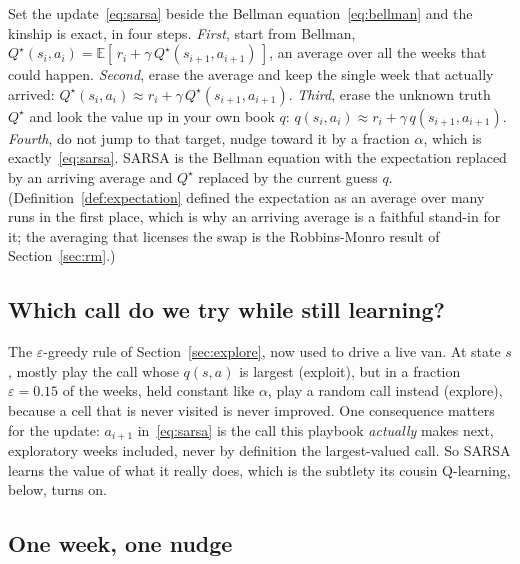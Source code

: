 \documentclass[11pt,a4paper]{article}
\theoremstyle{definition}
\theoremstyle{remark}
\numberwithin{equation}{section}
\newcommand{\E}{\mathbb{E}}
\begin{document}
Set the update~\eqref{eq:sarsa} beside the Bellman equation~\eqref{eq:bellman} and the kinship
is exact, in four steps. \emph{First}, start from Bellman,
$Q^\star(s_i, a_i) = \E[\, r_i + \gamma\, Q^\star(s_{i+1}, a_{i+1}) \,]$, an average over all
the weeks that could happen. \emph{Second}, erase the average and keep the single week that
actually arrived: $Q^\star(s_i, a_i) \approx r_i + \gamma\, Q^\star(s_{i+1}, a_{i+1})$.
\emph{Third}, erase the unknown truth $Q^\star$ and look the value up in your own book $q$:
$q(s_i, a_i) \approx r_i + \gamma\, q(s_{i+1}, a_{i+1})$. \emph{Fourth}, do not jump to that
target, nudge toward it by a fraction $\alpha$, which is exactly~\eqref{eq:sarsa}. SARSA is the
Bellman equation with the expectation replaced by an arriving average and $Q^\star$ replaced by
the current guess $q$. (Definition~\ref{def:expectation} defined the expectation as an average
over many runs in the first place, which is why an arriving average is a faithful stand-in for
it; the averaging that licenses the swap is the Robbins-Monro result of Section~\ref{sec:rm}.)

\subsection*{Which call do we try while still learning?}

The $\varepsilon$-greedy rule of Section~\ref{sec:explore}, now used to drive a live van. At
state $s$, mostly play the call whose $q(s, a)$ is largest (exploit), but in a fraction
$\varepsilon = 0.15$ of the weeks, held constant like $\alpha$, play a random call instead
(explore), because a cell that is never visited is never improved. One consequence matters for
the update: $a_{i+1}$ in~\eqref{eq:sarsa} is the call this playbook \emph{actually} makes next,
exploratory weeks included, never by definition the largest-valued call. So SARSA learns the
value of what it really does, which is the subtlety its cousin Q-learning, below, turns on.

\subsection*{One week, one nudge}
\end{document}
